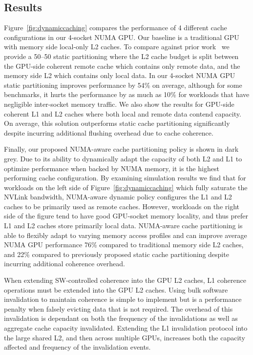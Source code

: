 \vspace{-0.1in}
\subsection{Results}

Figure~\ref{fig:dynamiccaching} compares the performance of 4 different cache
configurations in our 4-socket NUMA GPU. Our baseline is a traditional
GPU with memory side local-only L2 caches. To compare against prior work~\cite{Arunkumar2017} we
provide a 50--50 static partitioning where the L2 cache budget is split between the 
GPU-side coherent remote cache which contains only 
remote data, and the memory side L2 which contains only local data. In our 4-socket NUMA
GPU static partitioning improves performance by 54\% on average, although for some benchmarks, 
it hurts the performance by as much as 10\% for workloads that have negligible
inter-socket memory traffic. We also show the results for GPU-side
coherent L1 and L2 caches where both local and remote data contend capacity.
On average, this solution outperforms static cache partitioning significantly
despite incurring additional flushing overhead due to cache coherence.

Finally, our proposed NUMA-aware cache 
partitioning policy is shown in dark grey. Due to its ability to
dynamically adapt the capacity of both L2 and L1 to optimize performance when backed
by NUMA memory, it is the highest performing cache configuration. By examining
simulation results we find that for workloads on the left side of Figure~\ref{fig:dynamiccaching} 
which fully saturate the NVLink bandwidth, NUMA-aware dynamic policy configures the L1 and 
L2 caches to be primarily used as remote caches.  However, workloads on the right 
side of the figure tend to have good GPU-socket memory locality, and thus 
prefer L1 and L2 caches store primarily local data.  NUMA-aware cache
partitioning is able to flexibly adapt to varying memory access profiles and
can improve average NUMA GPU performance 76\% compared to traditional memory side L2
caches, and 22\% compared to previously proposed static cache partitioning despite
incurring additional coherence overhead.

When extending SW-controlled 
coherence into the GPU L2 
caches, L1 coherence operations must be extended into the GPU 
L2 caches. Using bulk software invalidation to maintain coherence is simple to
implement but is a performance penalty when falsely evicting
data that is not required. The overhead of this
invalidation is dependant on both the frequency of the invalidations as well as aggregate cache
capacity invalidated. Extending the L1 invalidation protocol into the large shared L2, and then across
multiple GPUs, increases both the capacity affected and frequency of the invalidation events.

